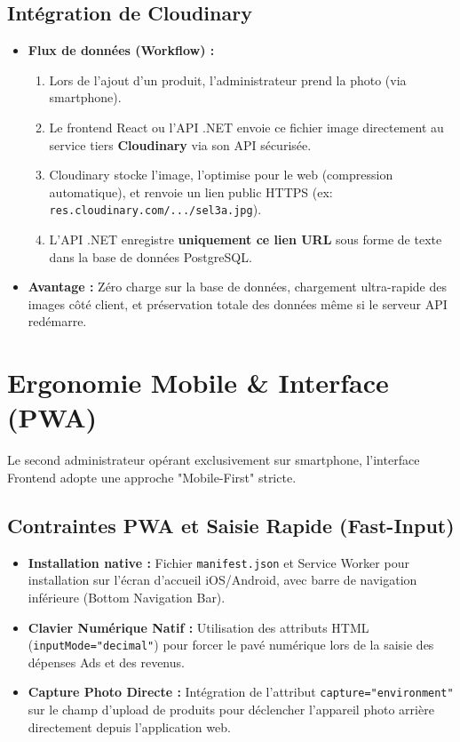 \documentclass[11pt,a4paper]{article}
\begin{document}
\subsection{Intégration de Cloudinary}
\begin{itemize}
    \item \textbf{Flux de données (Workflow) :} 
    \begin{enumerate}
        \item Lors de l'ajout d'un produit, l'administrateur prend la photo (via smartphone).
        \item Le frontend React ou l'API .NET envoie ce fichier image directement au service tiers \textbf{Cloudinary} via son API sécurisée.
        \item Cloudinary stocke l'image, l'optimise pour le web (compression automatique), et renvoie un lien public HTTPS (ex: \texttt{res.cloudinary.com/.../sel3a.jpg}).
        \item L'API .NET enregistre \textbf{uniquement ce lien URL} sous forme de texte dans la base de données PostgreSQL.
    \end{enumerate}
    \item \textbf{Avantage :} Zéro charge sur la base de données, chargement ultra-rapide des images côté client, et préservation totale des données même si le serveur API redémarre.
\end{itemize}

\section{Ergonomie Mobile \& Interface (PWA)}

Le second administrateur opérant exclusivement sur smartphone, l'interface Frontend adopte une approche "Mobile-First" stricte.

\subsection{Contraintes PWA et Saisie Rapide (Fast-Input)}
\begin{itemize}
    \item \textbf{Installation native :} Fichier \texttt{manifest.json} et Service Worker pour installation sur l'écran d'accueil iOS/Android, avec barre de navigation inférieure (Bottom Navigation Bar).
    \item \textbf{Clavier Numérique Natif :} Utilisation des attributs HTML (\texttt{inputMode="decimal"}) pour forcer le pavé numérique lors de la saisie des dépenses Ads et des revenus.
    \item \textbf{Capture Photo Directe :} Intégration de l'attribut \texttt{capture="environment"} sur le champ d'upload de produits pour déclencher l'appareil photo arrière directement depuis l'application web.
\end{itemize}
\end{document}
